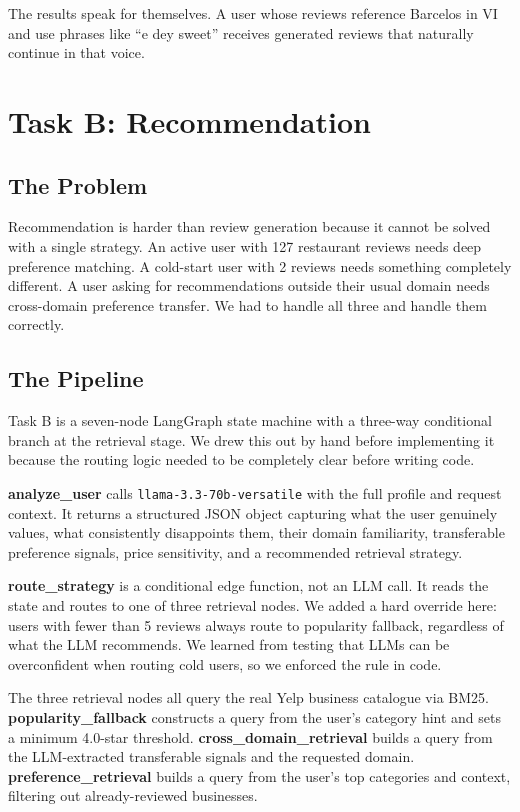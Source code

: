 \documentclass[11pt,a4paper]{article}
\begin{document}
The results speak for themselves. A user whose reviews reference Barcelos
in VI and use phrases like ``e dey sweet'' receives generated reviews that
naturally continue in that voice.

\section{Task B: Recommendation}

\subsection{The Problem}

Recommendation is harder than review generation because it cannot be solved
with a single strategy. An active user with 127 restaurant reviews needs
deep preference matching. A cold-start user with 2 reviews needs something
completely different. A user asking for recommendations outside their usual
domain needs cross-domain preference transfer. We had to handle all three
and handle them correctly.

\subsection{The Pipeline}

Task B is a seven-node LangGraph state machine with a three-way conditional
branch at the retrieval stage. We drew this out by hand before implementing
it because the routing logic needed to be completely clear before writing
code.

\textbf{analyze\_user} calls \texttt{llama-3.3-70b-versatile} with the
full profile and request context. It returns a structured JSON object
capturing what the user genuinely values, what consistently disappoints
them, their domain familiarity, transferable preference signals, price
sensitivity, and a recommended retrieval strategy.

\textbf{route\_strategy} is a conditional edge function, not an LLM call.
It reads the state and routes to one of three retrieval nodes. We added a
hard override here: users with fewer than 5 reviews always route to
popularity fallback, regardless of what the LLM recommends. We learned
from testing that LLMs can be overconfident when routing cold users, so we
enforced the rule in code.

The three retrieval nodes all query the real Yelp business catalogue via
BM25. \textbf{popularity\_fallback} constructs a query from the user's
category hint and sets a minimum 4.0-star threshold. 
\textbf{cross\_domain\_retrieval} builds a query from the LLM-extracted
transferable signals and the requested domain. \textbf{preference\_retrieval}
builds a query from the user's top categories and context, filtering out
already-reviewed businesses.
\end{document}
